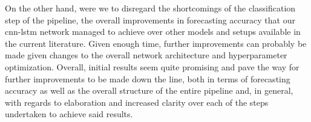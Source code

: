 \noindent \newline On the other hand, were we to disregard the shortcomings of the classification step of the pipeline, the overall improvements in forecasting accuracy that our \gls{cnn-lstm} network managed to achieve over other models and setups available in the current literature. Given enough time, further improvements can probably be made given changes to the overall network architecture and hyperparameter optimization. Overall, initial results seem quite promising and pave the way for further improvements to be made down the line, both in terms of forecasting accuracy as well as the overall structure of the entire pipeline and, in general, with regards to elaboration and increased clarity over each of the steps undertaken to achieve said results.